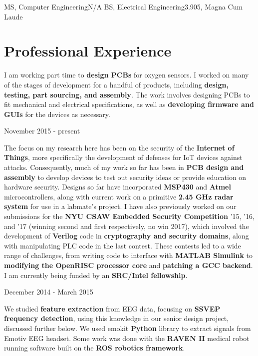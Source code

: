 \documentclass{my_resume}
\begin{document}

    {MS, Computer Engineering}{N/A}
	{BS, Electrical Engineering}{3.905, Magna Cum Laude}

\section{Professional Experience}
\begin{flushleft}
I am working part time to \textbf{design PCBs} for oxygen sensors.
I worked on many of the stages of development for a handful of products, including \textbf{design, testing, part sourcing, and assembly}.
The work involves designing PCBs to fit mechanical and electrical specifications, as well as \textbf{developing firmware and GUIs} for the devices as necessary.
\end{flushleft}
    {November 2015 - present}
\begin{flushleft}
The focus on my research here has been on the security of the \textbf{Internet of Things}, more specifically the development of defenses for IoT devices against attacks.
Consequently, much of my work so far has been in \textbf{PCB design and assembly} to develop devices to test out security ideas or provide education on hardware security.
Designs so far have incorporated \textbf{MSP430} and \textbf{Atmel} microcontrollers, along with current work on a primitive \textbf{2.45 GHz radar system} for use in a labmate's project.
I have also previously worked on our submissions for the \textbf{NYU CSAW Embedded Security Competition} '15, '16, and '17 (winning second and first respectively, no win 2017), which involved the development of \textbf{Verilog} code in \textbf{cryptography and security domains}, along with manipulating PLC code in the last contest.
These contests led to a wide range of challenges, from writing code to interface with \textbf{MATLAB Simulink} to \textbf{modifying the OpenRISC processor core} and \textbf{patching a GCC backend}.
I am currently being funded by an \textbf{SRC/Intel fellowship}.
\end{flushleft}
	{December 2014 - March 2015}
\begin{flushleft}
We studied \textbf{feature extraction} from EEG data, focusing on \textbf{SSVEP frequency detection}, using this knowledge in our senior design project, discussed further below.
We used emokit \textbf{Python} library to extract signals from Emotiv EEG headset.
Some work was done with the \textbf{RAVEN II} medical robot running software built on the \textbf{ROS robotics framework}.
\end{flushleft}
\end{document}

